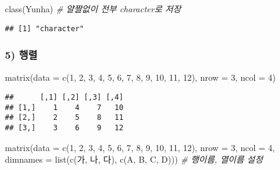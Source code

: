 \documentclass[
  12,
]{article}
\newenvironment{Shaded}{\begin{snugshade}}{\end{snugshade}}
\newcommand{\AttributeTok}[1]{\textcolor[rgb]{0.77,0.63,0.00}{#1}}
\newcommand{\CommentTok}[1]{\textcolor[rgb]{0.56,0.35,0.01}{\textit{#1}}}
\newcommand{\DecValTok}[1]{\textcolor[rgb]{0.00,0.00,0.81}{#1}}
\newcommand{\FunctionTok}[1]{\textcolor[rgb]{0.00,0.00,0.00}{#1}}
\newcommand{\NormalTok}[1]{#1}
\newcommand{\StringTok}[1]{\textcolor[rgb]{0.31,0.60,0.02}{#1}}
\begin{document}
\begin{Shaded}
\begin{Highlighting}[]
\FunctionTok{class}\NormalTok{(Yunha) }\CommentTok{\# 얄짤없이 전부 character로 저장}
\end{Highlighting}
\end{Shaded}

\begin{verbatim}
## [1] "character"
\end{verbatim}

\hypertarget{uxd589uxb82c}{%
\subsubsection{5) 행렬}\label{uxd589uxb82c}}

\begin{Shaded}
\begin{Highlighting}[]
\FunctionTok{matrix}\NormalTok{(}\AttributeTok{data =} \FunctionTok{c}\NormalTok{(}\DecValTok{1}\NormalTok{, }\DecValTok{2}\NormalTok{, }\DecValTok{3}\NormalTok{, }\DecValTok{4}\NormalTok{, }\DecValTok{5}\NormalTok{, }\DecValTok{6}\NormalTok{, }\DecValTok{7}\NormalTok{, }\DecValTok{8}\NormalTok{, }\DecValTok{9}\NormalTok{, }\DecValTok{10}\NormalTok{, }\DecValTok{11}\NormalTok{, }\DecValTok{12}\NormalTok{), }\AttributeTok{nrow =} \DecValTok{3}\NormalTok{, }\AttributeTok{ncol =} \DecValTok{4}\NormalTok{)}
\end{Highlighting}
\end{Shaded}

\begin{verbatim}
##      [,1] [,2] [,3] [,4]
## [1,]    1    4    7   10
## [2,]    2    5    8   11
## [3,]    3    6    9   12
\end{verbatim}

\begin{Shaded}
\begin{Highlighting}[]
\FunctionTok{matrix}\NormalTok{(}\AttributeTok{data =} \FunctionTok{c}\NormalTok{(}\DecValTok{1}\NormalTok{, }\DecValTok{2}\NormalTok{, }\DecValTok{3}\NormalTok{, }\DecValTok{4}\NormalTok{, }\DecValTok{5}\NormalTok{, }\DecValTok{6}\NormalTok{, }\DecValTok{7}\NormalTok{, }\DecValTok{8}\NormalTok{, }\DecValTok{9}\NormalTok{, }\DecValTok{10}\NormalTok{, }\DecValTok{11}\NormalTok{, }\DecValTok{12}\NormalTok{), }\AttributeTok{nrow =} \DecValTok{3}\NormalTok{, }\AttributeTok{ncol =} \DecValTok{4}\NormalTok{, }\AttributeTok{dimnames =} \FunctionTok{list}\NormalTok{(}\FunctionTok{c}\NormalTok{(}\StringTok{\textquotesingle{}가\textquotesingle{}}\NormalTok{, }\StringTok{\textquotesingle{}나\textquotesingle{}}\NormalTok{, }\StringTok{\textquotesingle{}다\textquotesingle{}}\NormalTok{), }\FunctionTok{c}\NormalTok{(}\StringTok{\textquotesingle{}A\textquotesingle{}}\NormalTok{, }\StringTok{\textquotesingle{}B\textquotesingle{}}\NormalTok{, }\StringTok{\textquotesingle{}C\textquotesingle{}}\NormalTok{, }\StringTok{\textquotesingle{}D\textquotesingle{}}\NormalTok{))) }\CommentTok{\# 행이름, 열이름 설정}
\end{Highlighting}
\end{Shaded}
\end{document}
